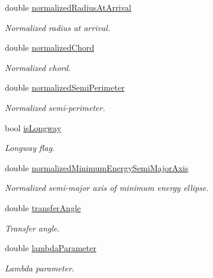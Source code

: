 \begin{DoxyCompactItemize}
double \hyperlink{classtudat_1_1mission__segments_1_1ZeroRevolutionLambertTargeterIzzo_a4133b5fc450c7c15ca666d0983fa923d}{normalized\+Radius\+At\+Arrival}
\begin{DoxyCompactList}\small\item\em Normalized radius at arrival. \end{DoxyCompactList}\item 
double \hyperlink{classtudat_1_1mission__segments_1_1ZeroRevolutionLambertTargeterIzzo_a7f243a99425c70154c051269459046c9}{normalized\+Chord}
\begin{DoxyCompactList}\small\item\em Normalized chord. \end{DoxyCompactList}\item 
double \hyperlink{classtudat_1_1mission__segments_1_1ZeroRevolutionLambertTargeterIzzo_a5cde7bf679ff8e2099c5350dbbb103aa}{normalized\+Semi\+Perimeter}
\begin{DoxyCompactList}\small\item\em Normalized semi-\/perimeter. \end{DoxyCompactList}\item 
bool \hyperlink{classtudat_1_1mission__segments_1_1ZeroRevolutionLambertTargeterIzzo_a8049243b12a78c7308869558583d6558}{is\+Longway}
\begin{DoxyCompactList}\small\item\em Longway flag. \end{DoxyCompactList}\item 
double \hyperlink{classtudat_1_1mission__segments_1_1ZeroRevolutionLambertTargeterIzzo_addb8147855117bb086dd07f28b766f93}{normalized\+Minimum\+Energy\+Semi\+Major\+Axis}
\begin{DoxyCompactList}\small\item\em Normalized semi-\/major axis of minimum energy ellipse. \end{DoxyCompactList}\item 
double \hyperlink{classtudat_1_1mission__segments_1_1ZeroRevolutionLambertTargeterIzzo_ad122718ab907efaf27eb18f4f15baabc}{transfer\+Angle}
\begin{DoxyCompactList}\small\item\em Transfer angle. \end{DoxyCompactList}\item 
double \hyperlink{classtudat_1_1mission__segments_1_1ZeroRevolutionLambertTargeterIzzo_ab173c76a2cc122df13c2a43201508211}{lambda\+Parameter}
\begin{DoxyCompactList}\small\item\em Lambda parameter. \end{DoxyCompactList}\end{DoxyCompactItemize}


